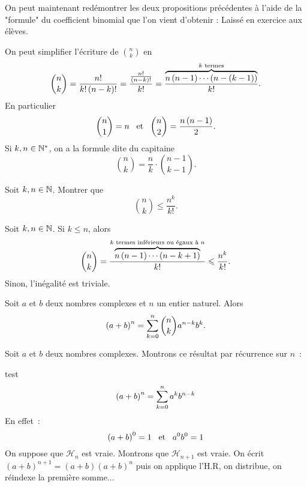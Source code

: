 \documentclass{magnolia}
\begin{document}
\begin{preuve}
On peut maintenant redémontrer les deux propositions précédentes à l'aide de la "formule" du coefficient binomial que l'on vient d'obtenir :
Laissé en exercice aux élèves.

\end{preuve}
\begin{remarques}
\remarque On peut simplifier l'écriture de $\binom{n}{k}$ en
  \[\binom{n}{k}=\frac{n!}{k!\left(n-k\right)!}=\frac{\frac{n!}{\left(n-k\right)!}}{k!}=
    \frac{\overbrace{n\left(n-1\right)\cdots\left(n-(k-1)\right)}^{\text{$k$ termes}}}{k!}.\]
  En particulier
  \[\binom{n}{1}=n \quad\!\text{et}\quad\! \binom{n}{2}=\frac{n\left(n-1\right)}{2}.\]
\remarque Si $k,n\in{\mathbb{N}^*}$, on a la formule dite \og du capitaine \fg
  \[\binom{n}{k}=\frac{n}{k}\cdot\binom{n-1}{k-1}.\]
\end{remarques}

\begin{exoUnique}
\exo Soit $k,n\in\mathbb{N}$. Montrer que
  \[\binom{n}{k}\leq\frac{n^k}{k!}.\]
  \begin{sol}
  Soit $k,n\in\mathbb{N}$. Si $k\leq n$, alors
  \[\binom{n}{k}=
    \frac{\overbrace{n\left(n-1\right)\cdots\left(n-k+1\right)}^{\text{$k$ termes inférieurs ou égaux à $n$}}}{k!}\leqslant \frac{n^k}{k!}.\]
  Sinon, l'inégalité est triviale.
  \end{sol}
\end{exoUnique}


\begin{proposition}[utile=3, nom=Binôme de \nom{Newton}]
Soit $a$ et $b$ deux nombres complexes et $n$ un entier naturel. Alors
\[\left(a+b\right)^n=\sum_{k=0}^n \binom{n}{k}a^{n-k} b^k.\]
\end{proposition}
\begin{preuve}
Soit $a$ et $b$ deux nombres complexes. Montrons ce résultat par récurrence
sur $n$~:
\begin{recurrence}
test $$\left(a+b\right)^n=\sum_{k=0}^n a^k b^{n-k}$$
\recinit En effet~:
  $$\left(a+b\right)^0=1 \quad\!\text{et}\quad\! a^0 b^0=1$$
\rechere On suppose que $\mathcal{H}_n$ est vraie. Montrons que
  $\mathcal{H}_{n+1}$ est vraie.
  On écrit $(a+b)^{n+1}=(a+b)(a+b)^n$ puis on applique l'H.R, on distribue, on réindexe la première somme...
\end{recurrence}
\end{preuve}
\end{document}
